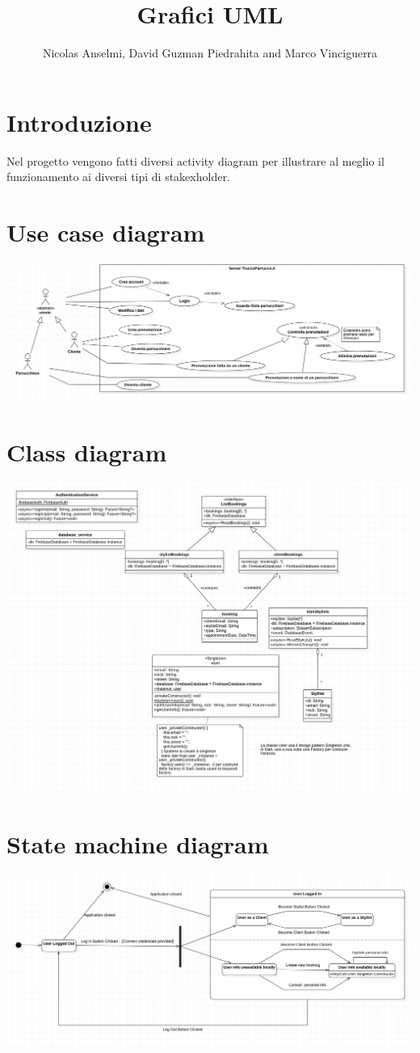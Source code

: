 \documentclass{article}
\title{Grafici UML}
\author{Nicolas Anselmi, David Guzman Piedrahita and Marco Vinciguerra}
\begin{document}
\maketitle        
\section{Introduzione}
Nel progetto vengono fatti diversi activity diagram per illustrare al
meglio il funzionamento ai diversi tipi di stakexholder.
 
\section{Use case diagram}
\includegraphics[scale = 0.45]{ImmaginiUML/UseCase.png}
\section{Class diagram}
\includegraphics[scale = 0.5]{ImmaginiUML/ClassDiagram.png}
\newpage
\section{State machine diagram}
\includegraphics[scale = 0.5]{ImmaginiUML/StateMachineDiagram.png}
\newpage
\end{document}
